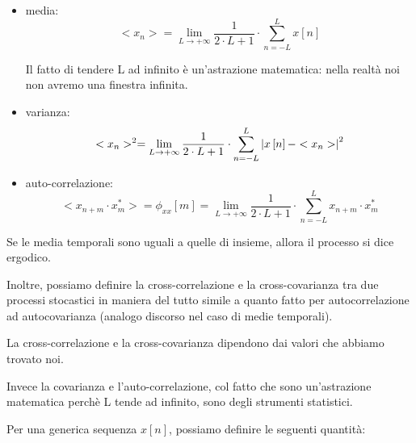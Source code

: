 \begin{itemize}
    \item media: 
    {
        \Large 
        \begin{equation}
            <x_{n}> = \lim_{L \to + \infty} \dfrac{1}{2 \cdot L + 1} \cdot \sum_{n = - L}^{L} x \left[ n\right] 
        \end{equation}
    }
    \begin{tcolorbox}
        Il fatto di tendere L ad infinito è un'astrazione matematica: nella realtà noi non avremo una finestra infinita. 
    \end{tcolorbox}
    \item varianza: 
    {
        \Large 
        \begin{equation}
            <x_{n}>^{2} = \lim_{L \to + \infty} \dfrac{1}{2 \cdot L + 1} \cdot \sum_{n = - L}^{L} \abs{x \left[ n\right] - <x_{n}>}^{2} 
        \end{equation}
    }
    \item auto-correlazione: 
    {
        \Large 
        \begin{equation}
            <x_{n+m} \cdot x_{m}^{*}> = \phi_{xx} \left[ m\right] = \lim_{L \to + \infty} \dfrac{1}{2 \cdot L + 1} \cdot \sum_{n = - L}^{L} x_{n+m} \cdot x_{m}^{*}  
        \end{equation}
    }
\end{itemize}

Se le media temporali sono uguali a quelle di insieme, allora il processo si dice ergodico. \newline 

Inoltre, possiamo definire la cross-correlazione e la cross-covarianza tra due processi stocastici in maniera del tutto simile a quanto fatto per autocorrelazione ad autocovarianza 
(analogo discorso nel caso di medie temporali). \newline 

\begin{tcolorbox}
La cross-correlazione e la cross-covarianza dipendono dai valori che abbiamo trovato noi. \newline 

Invece la covarianza e l'auto-correlazione, col fatto che sono un'astrazione matematica perchè L tende ad infinito, 
sono degli strumenti statistici. 
\end{tcolorbox}

Per una generica sequenza $x \left[ n\right]$, possiamo definire le seguenti quantità: 

